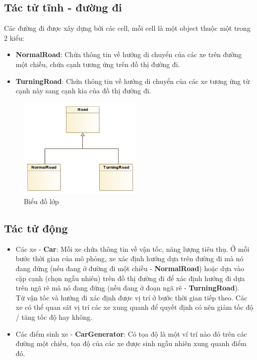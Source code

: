 \documentclass[../report.tex]{subfiles}
\begin{document}
\subsection{Tác tử tĩnh - đường đi}
Các đường đi được xây dựng bởi các cell, mỗi cell là một object thuộc một trong 2 kiểu: 
\begin{itemize}
\item \textbf{NormalRoad}: Chứa thông tin về hướng di chuyển của các xe 
    trên đường một chiều, chứa cạnh tương ứng trên đồ thị đường đi. 
\item \textbf{TurningRoad}: Chứa thông tin về hướng di chuyển của các xe tương ứng từ cạnh này sang cạnh kia của đồ thị đường đi. 
\end{itemize}

\begin{figure}[H]
\centering
\includegraphics[width=6cm]{figures/road-diagram.png}
\caption{Biểu đồ lớp}
\end{figure}

\subsection{Tác tử động}
\begin{itemize}
\item Các xe - \textbf{Car}: Mỗi xe chứa thông tin về vận tốc, năng lượng tiêu thụ. 
Ở mỗi bước thời gian của mô phỏng, xe xác định hướng dựa trên 
đường đi mà nó đang đứng (nếu đang ở đường đi một chiều - \textbf{NormalRoad}) 
hoặc dựa vào cặp cạnh (chọn ngẫu nhiên) trên đồ thị đường đi để xác định hướng 
đi dựa trên ngã rẽ mà nó đang đứng (nếu đang ở đoạn ngã rẽ - \textbf{TurningRoad}).  \\
Từ vận tốc và hướng đi xác định được vị trí ở bước thời gian tiếp theo. 
Các xe có thể quan sát vị trí các xe xung quanh để quyết định có nên giảm tốc độ / tăng tốc độ hay không. 
\item Các điểm sinh xe - \textbf{CarGenerator}: Có tọa độ là một ví trí nào đó trên các đường một chiều, 
tọa độ của các xe được sinh ngẫu nhiên xung quanh điểm đó. 
\end{itemize}
\end{document}
